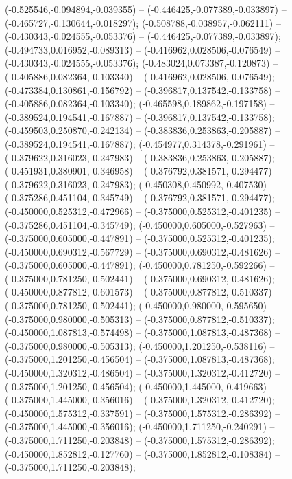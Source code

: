  (-0.525546,-0.094894,-0.039355) -- (-0.446425,-0.077389,-0.033897) -- (-0.465727,-0.130644,-0.018297);
 (-0.508788,-0.038957,-0.062111) -- (-0.430343,-0.024555,-0.053376) -- (-0.446425,-0.077389,-0.033897);
 (-0.494733,0.016952,-0.089313) -- (-0.416962,0.028506,-0.076549) -- (-0.430343,-0.024555,-0.053376);
 (-0.483024,0.073387,-0.120873) -- (-0.405886,0.082364,-0.103340) -- (-0.416962,0.028506,-0.076549);
 (-0.473384,0.130861,-0.156792) -- (-0.396817,0.137542,-0.133758) -- (-0.405886,0.082364,-0.103340);
 (-0.465598,0.189862,-0.197158) -- (-0.389524,0.194541,-0.167887) -- (-0.396817,0.137542,-0.133758);
 (-0.459503,0.250870,-0.242134) -- (-0.383836,0.253863,-0.205887) -- (-0.389524,0.194541,-0.167887);
 (-0.454977,0.314378,-0.291961) -- (-0.379622,0.316023,-0.247983) -- (-0.383836,0.253863,-0.205887);
 (-0.451931,0.380901,-0.346958) -- (-0.376792,0.381571,-0.294477) -- (-0.379622,0.316023,-0.247983);
 (-0.450308,0.450992,-0.407530) -- (-0.375286,0.451104,-0.345749) -- (-0.376792,0.381571,-0.294477);
 (-0.450000,0.525312,-0.472966) -- (-0.375000,0.525312,-0.401235) -- (-0.375286,0.451104,-0.345749);
 (-0.450000,0.605000,-0.527963) -- (-0.375000,0.605000,-0.447891) -- (-0.375000,0.525312,-0.401235);
 (-0.450000,0.690312,-0.567729) -- (-0.375000,0.690312,-0.481626) -- (-0.375000,0.605000,-0.447891);
 (-0.450000,0.781250,-0.592266) -- (-0.375000,0.781250,-0.502441) -- (-0.375000,0.690312,-0.481626);
 (-0.450000,0.877812,-0.601573) -- (-0.375000,0.877812,-0.510337) -- (-0.375000,0.781250,-0.502441);
 (-0.450000,0.980000,-0.595650) -- (-0.375000,0.980000,-0.505313) -- (-0.375000,0.877812,-0.510337);
 (-0.450000,1.087813,-0.574498) -- (-0.375000,1.087813,-0.487368) -- (-0.375000,0.980000,-0.505313);
 (-0.450000,1.201250,-0.538116) -- (-0.375000,1.201250,-0.456504) -- (-0.375000,1.087813,-0.487368);
 (-0.450000,1.320312,-0.486504) -- (-0.375000,1.320312,-0.412720) -- (-0.375000,1.201250,-0.456504);
 (-0.450000,1.445000,-0.419663) -- (-0.375000,1.445000,-0.356016) -- (-0.375000,1.320312,-0.412720);
 (-0.450000,1.575312,-0.337591) -- (-0.375000,1.575312,-0.286392) -- (-0.375000,1.445000,-0.356016);
 (-0.450000,1.711250,-0.240291) -- (-0.375000,1.711250,-0.203848) -- (-0.375000,1.575312,-0.286392);
 (-0.450000,1.852812,-0.127760) -- (-0.375000,1.852812,-0.108384) -- (-0.375000,1.711250,-0.203848);
